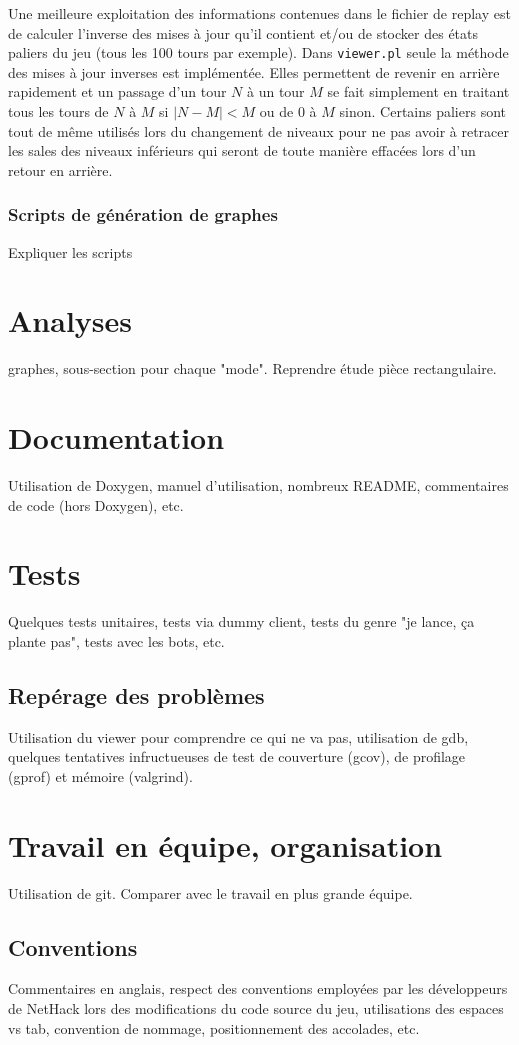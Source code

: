 \documentclass[a4paper,12pt]{article}
\begin{document}
Une meilleure exploitation des informations contenues dans le fichier de replay est de calculer l'inverse des mises à jour qu'il contient et/ou de stocker des états paliers du jeu (tous les 100 tours par exemple). Dans \verb!viewer.pl! seule la méthode des mises à jour inverses est implémentée. Elles permettent de revenir en arrière rapidement et un passage d'un tour $N$ à un tour $M$ se fait simplement en traitant tous les tours de $N$ à $M$ si $|N-M| < M$ ou de $0$ à $M$ sinon. Certains paliers sont tout de même utilisés lors du changement de niveaux pour ne pas avoir à retracer les sales des niveaux inférieurs qui seront de toute manière effacées lors d'un retour en arrière.

\subsubsection*{Scripts de génération de graphes}

Expliquer les scripts


\section{Analyses}

graphes, sous-section pour chaque "mode". Reprendre étude pièce rectangulaire.

\section{Documentation}
Utilisation de Doxygen, manuel d'utilisation, nombreux README, commentaires de
code (hors Doxygen), etc.

\section{Tests}
Quelques tests unitaires, tests via dummy client, tests du genre "je lance, ça
plante pas", tests avec les bots, etc.

\subsection*{Repérage des problèmes}
Utilisation du viewer pour comprendre ce qui ne va pas, utilisation de gdb,
quelques tentatives infructueuses de test de couverture (gcov), de profilage
(gprof) et mémoire (valgrind).

\section{Travail en équipe, organisation}

Utilisation de git.
Comparer avec le travail en plus grande équipe.

\subsection{Conventions}
Commentaires en anglais, respect des conventions employées par les
développeurs de NetHack lors des modifications du code source du jeu,
utilisations des espaces vs tab, convention de nommage, positionnement des
accolades, etc.
\end{document}
